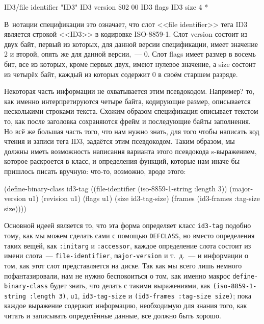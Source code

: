 \begin{myverb}
ID3/file identifier      "ID3"
ID3 version              \$02 00
ID3 flags                %
ID3 size             4 * %
\end{myverb}

В~нотации спецификации это означает, что слот <<file identifier>> тега ID3 является строкой
<<ID3>> в кодировке ISO-8859-1. Слот version состоит из двух байт, первый из которых, для
данной версии спецификации, имеет значение 2 и второй, опять же для данной версии,~---
0. Слот flags имеет размер в восемь бит, все из которых, кроме первых двух, имеют нулевое
значение, а size состоит из четырёх байт, каждый из которых содержит 0 в своём старшем
разряде.

Некоторая часть информации не охватывается этим псевдокодом. Например? то, как именно
интерпретируются четыре байта, кодирующие размер, описывается несколькими строками
текста. Схожим образом спецификация описывает текстом то, как после заголовка сохраняются
фрейм и последующие байты заполнения. Но всё же большая часть того, что нам нужно знать,
для того чтобы написать код чтения и записи тега ID3, задаётся этим псевдокодом. Таким
образом, мы должны иметь возможность напи\-сания варианта этого псевдокода s-выражением,
которое раскроется в класс, и определения функций, которые нам иначе бы пришлось писать
вручную: что-то, возможно, вроде этого:

\begin{myverb}
(define-binary-class id3-tag
  ((file-identifier (iso-8859-1-string :length 3))
   (major-version   u1)
   (revision        u1)
   (flags           u1)
   (size            id3-tag-size)
   (frames          (id3-frames :tag-size size))))
\end{myverb}

Основной идеей является то, что эта форма определяет класс \lstinline{id3-tag} подобно тому,
как мы можем сделать сами с помощью \lstinline{DEFCLASS}, но вместо определения таких вещей,
как \lstinline{:initarg} и \lstinline{:accessor}, каждое определение слота состоит из имени
слота~--- \lstinline{file-identifier}, \lstinline{major-version} и т.~д.~--- и информации о том, как
этот слот представляется на диске. Так как мы всего лишь немного пофантазировали, нам не
нужно беспокоиться о том, как именно макрос \lstinline{define-binary-class} будет знать, что
делать с такими выражениями, как \lstinline{(iso-8859-1-string :length 3)}, \lstinline{u1},
\lstinline{id3-tag-size} и \lstinline{(id3-frames :tag-size size)}; пока каждое выражение содержит
информацию, необходимую для знания того, как читать и записывать определённые данные, все
должно быть хорошо.


